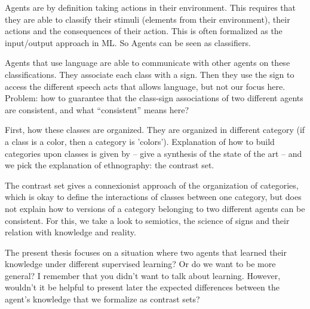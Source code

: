 Agents are by definition taking actions in their environment. This requires that they are able to classify their stimuli (elements from their environment), their actions and the consequences of their action. This is often formalized as the input/output approach in ML. So Agents can be seen as classifiers.

Agents that use language are able to communicate with other agents on these classifications. They associate each class with a sign. Then they use the sign to access the different speech acts that allows language, but not our focus here. Problem: how to guarantee that the class-sign associations of two different agents are consistent, and what ``consistent'' means here?

First, how these classes are organized. They are organized in different category (if a class is a color, then a category is 'colors'). Explanation of how to build categories upon classes is given by -- give a synthesis of the state of the art -- and we pick the explanation of ethnography: the contrast set.

The contrast set gives a connexionist approach of the organization of categories, which is okay to define the interactions of classes between one category, but does not explain how to versions of a category belonging to two different agents can be consistent. For this, we take a look to semiotics, the science of signs and their relation with knowledge and reality. 

The present thesis focuses on a situation where two agents that {\color{red} learned their knowledge under different supervised learning? Or do we want to be more general? I remember that you didn't want to talk about learning. However, wouldn't it be helpful to present later the expected differences between the agent's knowledge that we formalize as contrast sets?}







